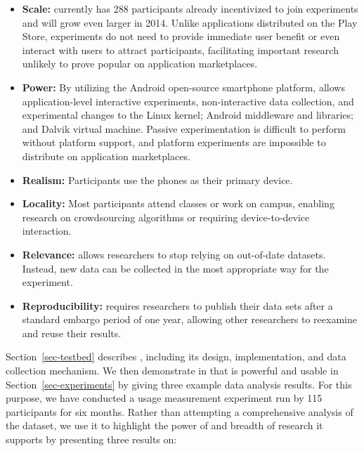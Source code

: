 \begin{itemize}

\item \textbf{Scale:} \PhoneLab{} currently has 288 participants already
incentivized to join experiments and will grow even larger in 2014. Unlike
applications distributed on the Play Store, \PhoneLab{} experiments do not
need to provide immediate user benefit or even interact with users to attract
participants, facilitating important research unlikely to prove popular on
application marketplaces.

\item \textbf{Power:} By utilizing the Android open-source smartphone
platform, \PhoneLab{} allows application-level interactive experiments,
non-interactive data collection, and experimental changes to the Linux
kernel; Android middleware and libraries; and Dalvik virtual machine. Passive
experimentation is difficult to perform without platform support, and
platform experiments are impossible to distribute on application
marketplaces.

\item \textbf{Realism:} Participants use the phones as their primary device.

\item \textbf{Locality:} Most participants attend classes or work on campus,
enabling research on crowdsourcing algorithms or requiring device-to-device
interaction.

\item \textbf{Relevance:} \PhoneLab{} allows researchers to stop relying on
out-of-date datasets. Instead, new data can be collected in the most
appropriate way for the experiment.

\item \textbf{Reproducibility:} \PhoneLab{} requires researchers to publish
their data sets after a standard embargo period of one year, allowing other
researchers to reexamine and reuse their results.

\end{itemize}

Section~\ref{sec-testbed} describes \PhoneLab{}, including its design,
implementation, and data collection mechanism. We then demonstrate in that
\PhoneLab{} is powerful and usable in Section~\ref{sec-experiments} by giving
three example data analysis results. For this purpose, we have conducted a
usage measurement experiment run by 115 \PhoneLab{} participants for six
months. Rather than attempting a comprehensive analysis of the dataset, we
use it to highlight the power of \PhoneLab{} and breadth of research it
supports by presenting three results on:

